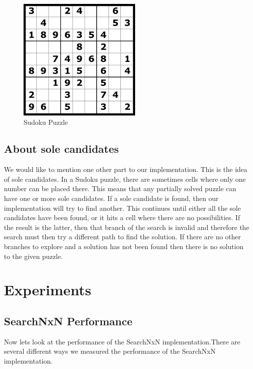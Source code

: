 \documentclass[letterpaper]{article}
\begin{document}
\begin{figure}[h]
	\centering
	\includegraphics[width=60mm]{./Sudoku-games.png}
	\caption{Sudoku Puzzle}
	\label{fig:sudoku-puzzle}
\end{figure}

\subsection{About sole candidates}

We would like to mention one other part to our implementation. This is the idea of sole candidates. In a Sudoku puzzle, there are sometimes cells where only one number can be placed there. This means that any partially solved puzzle can have one or more sole candidates. If a sole candidate is found, then our implementation will try to find another. This continues until either all the sole candidates have been found, or it hits a cell where there are no possibilities. If the result is the latter, then that branch of the search is invalid and therefore the search must then try a different path to find the solution. If there are no other branches to explore and a solution has not been found then there is no solution to the given puzzle.

\section{Experiments\newline}

\subsection{SearchNxN Performance}

Now lets look at the performance of the SearchNxN implementation.There are several different ways we measured the performance of the SearchNxN implementation.
\end{document}

